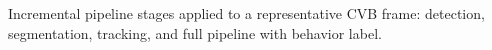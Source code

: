 \caption{Incremental pipeline stages applied to a representative CVB frame: detection, segmentation, tracking, and full pipeline with behavior label.}\label{fig:pipeline-progression-cvb}
